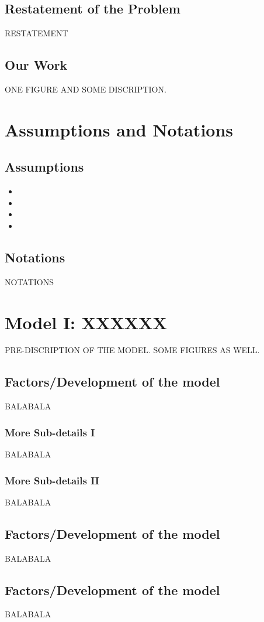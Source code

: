 \documentclass{mcmthesis}
\begin{document}
\subsection{Restatement of the Problem}
RESTATEMENT
\subsection{Our Work}
ONE FIGURE AND SOME DISCRIPTION.

\section{Assumptions and Notations}
\subsection{Assumptions}
\begin{itemize}
	\item
	\item
	\item
	\item
\end{itemize}
\subsection{Notations}
NOTATIONS

\section{Model I: XXXXXX}
PRE-DISCRIPTION OF THE MODEL. SOME FIGURES AS WELL.
\subsection{Factors/Development of the model}
BALABALA
\subsubsection{More Sub-details I}
BALABALA
\subsubsection{More Sub-details II}
BALABALA
\subsection{Factors/Development of the model}
BALABALA
\subsection{Factors/Development of the model}
BALABALA
\end{document}
